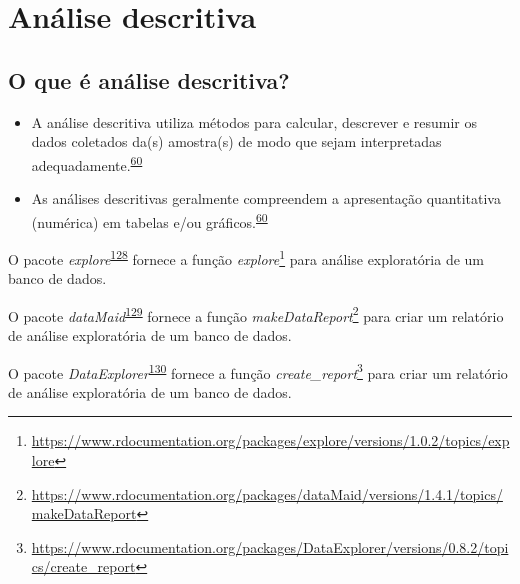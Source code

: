 \documentclass[
  a4paper,
]{book}
\renewcommand{\href}[2]{#2\footnote{\url{#1}}}
\newenvironment{infobox}[1]
  {
  \begin{itemize}
  \renewcommand{\labelitemi}{
    \raisebox{-.7\height}[0pt][0pt]{
      {\setkeys{Gin}{width=3em,keepaspectratio}
        \texttt{[image: \#1]}}
    }
  }
  \setlength{\fboxsep}{1em}
  \begin{blackbox}
  \item
  }
  {
  \end{blackbox}
  \end{itemize}
  }
\begin{document}
\hypertarget{descritiva}{%
\section{Análise descritiva}\label{descritiva}}

\hypertarget{o-que-uxe9-anuxe1lise-descritiva}{%
\subsection{O que é análise descritiva?}\label{o-que-uxe9-anuxe1lise-descritiva}}

\begin{itemize}
\item
  A análise descritiva utiliza métodos para calcular, descrever e resumir os dados coletados da(s) amostra(s) de modo que sejam interpretadas adequadamente.\textsuperscript{\protect\hyperlink{ref-vetter2017}{60}}
\item
  As análises descritivas geralmente compreendem a apresentação quantitativa (numérica) em tabelas e/ou gráficos.\textsuperscript{\protect\hyperlink{ref-vetter2017}{60}}
\end{itemize}

\begin{infobox}{images/Rlogo}
O pacote \emph{explore}\textsuperscript{\protect\hyperlink{ref-explore}{128}} fornece a função \href{https://www.rdocumentation.org/packages/explore/versions/1.0.2/topics/explore}{\emph{explore}} para análise exploratória de um banco de dados.

\end{infobox}

\begin{infobox}{images/Rlogo}
O pacote \emph{dataMaid}\textsuperscript{\protect\hyperlink{ref-dataMaid}{129}} fornece a função \href{https://www.rdocumentation.org/packages/dataMaid/versions/1.4.1/topics/makeDataReport}{\emph{makeDataReport}} para criar um relatório de análise exploratória de um banco de dados.

\end{infobox}

\begin{infobox}{images/Rlogo}
O pacote \emph{DataExplorer}\textsuperscript{\protect\hyperlink{ref-DataExplorer-2}{130}} fornece a função \href{https://www.rdocumentation.org/packages/DataExplorer/versions/0.8.2/topics/create_report}{\emph{create\_report}} para criar um relatório de análise exploratória de um banco de dados.

\end{infobox}
\end{document}
